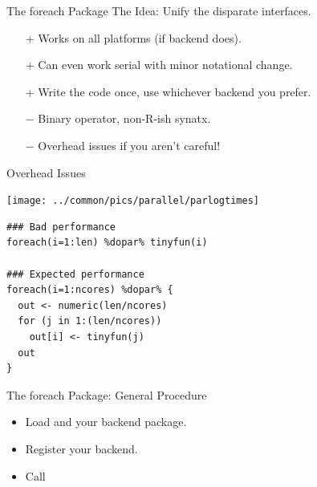 \begin{frame}
  \begin{block}{The foreach Package}
    The Idea: Unify the disparate interfaces.
    \begin{itemize}
      \item[+] Works on all platforms (if backend does).
      \item[+] Can even work serial with minor notational change.
      \item[+] Write the code once, use whichever backend you prefer.
      \item[$-$] Binary operator, non-R-ish synatx.
      \item[$-$] Overhead issues if you aren't careful!
    \end{itemize}
  \end{block}
\end{frame}


\begin{frame}[fragile]{Overhead Issues}
\vspace{-.4cm}\hspace{-.6cm}
  \begin{minipage}[t]{.55\textwidth}
    \begin{center}
      \texttt{[image: ../common/pics/parallel/parlogtimes]}
    \end{center}
  \end{minipage}
  \hspace{.1cm}
  \begin{minipage}[t]{.45\textwidth}
\begin{lstlisting}
### Bad performance
foreach(i=1:len) %dopar% tinyfun(i)

### Expected performance
foreach(i=1:ncores) %dopar% {
  out <- numeric(len/ncores)
  for (j in 1:(len/ncores))
    out[i] <- tinyfun(j)
  out
}
\end{lstlisting}
  \end{minipage}
\end{frame}


\begin{frame}
  \begin{block}{The foreach Package: General Procedure}
    \begin{itemize}
      \item Load  and your backend package.
      \item Register your backend.
      \item Call 
    \end{itemize}
  \end{block}
\end{frame}


